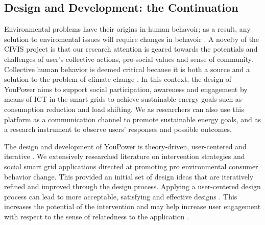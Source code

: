 
\subsection{Design and Development: the Continuation}

Environmental problems have their origins in human behavoir; as a result, any solution to enviromental issues will require changes in behavoir 
\citep{Schultz2014}.
A novelty of the CIVIS project is that our research attention is geared towards the potentials and challenges of user's collective actions, pro-social values and sense of community. 
Collective human behavior is deemed critical because it is both a source and a solution to the problem of climate change \citep{Masson2014}.
In this context, the design of YouPower aims to support social participation, awareness and engagement by means of ICT in the smart grids to achieve sustainable energy goals such as consumption reduction and load shifting. We as researchers can also use this platform as a communication channel to promote sustainable energy goals, and as a research instrument to observe users' responses and possible outcomes. 



The design and development of YouPower is theory-driven, user-centered and iterative \citep{Leffingwell2000,Leffingwell2011}. We extensively researched literature on intervention strategies and social smart grid applications directed at promoting pro environmental consumer behavior change. This provided an initial set of design ideas that are iteratively refined and improved through the design process. Applying a user-centered design process can lead to more acceptable, satisfying and effective designs \citep{Brynjarsdottir2012}. This increases the potential of the intervention \citep{dick2012empowering} and may help increase user engagement with respect to the sense of relatedness to the application \citep{pierce2003state,schwartz2014people,edward2015review}. 


